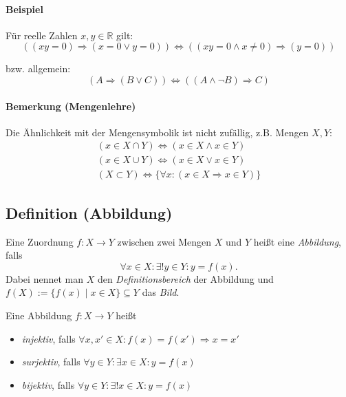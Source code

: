 \paragraph{Beispiel}
	Für reelle Zahlen $x,y\in\mathbb{R}$ gilt:
	\begin{equation*}
		\left((xy = 0)\Rightarrow (x=0 \lor y=0)\right) \Leftrightarrow \left((xy=0 \land x \neq 0)\Rightarrow (y =0)\right)
	\end{equation*}
	
	bzw. allgemein:
	\begin{equation*}
		(A\Rightarrow (B\lor C))\Leftrightarrow ((A\land\lnot B)\Rightarrow C)
	\end{equation*}

\paragraph{Bemerkung (Mengenlehre)}
	Die Ähnlichkeit mit der Mengensymbolik ist nicht zufällig, z.B. Mengen $X, Y$:
	\begin{gather*}
		(x\in X\cap Y)\Leftrightarrow (x\in X\land x\in Y)\\
		(x\in X\cup Y)\Leftrightarrow (x\in X\lor x\in Y)\\
		(X\subset Y) \Leftrightarrow \{\forall x : (x\in X \Rightarrow x\in Y)\}
	\end{gather*}

\subsection*{Definition (Abbildung)}
	\begin{Definition}[Abbildung]
		Eine Zuordnung $f: X\to Y$ zwischen zwei Mengen $X$ und $Y$ heißt eine \emph{Abbildung}, falls 
		\[\forall x\in X: \exists ! y\in Y: y=f(x).\]
	Dabei nennet man $X$ den \emph{Definitionsbereich} der Abbildung und $f(X):=\{f(x)\mid x\in X \}\subseteq Y$ das \emph{Bild}.

	Eine Abbildung $f: X\to Y$ heißt
	\begin{itemize}
		\item \emph{injektiv}, falls $\forall x,x'\in X:f(x) = f(x') \Rightarrow x=x'$
		\item \emph{surjektiv}, falls $\forall y\in Y:\exists x\in X: y = f(x)$
		\item \emph{bijektiv}, falls $\forall y\in Y:\exists !x\in X: y = f(x)$
	\end{itemize}
	\end{Definition}

